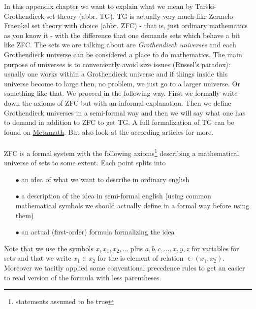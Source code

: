 In this appendix chapter we want to explain what we mean by Tarski-Grothendieck set theory (abbr. TG). TG is actually very much like Zermelo-Fraenkel set theory with choice (abbr. ZFC) - that is, just ordinary mathematics as you know it - with the difference that one demands sets which behave a bit like ZFC. The sets we are talking about are \textit{Grothendieck universes} and each Grothendieck universe can be considered a place to do mathematics. The main purpose of universes is to conveniently avoid size issues (Russel's paradox): usually one works within a Grothendieck universe and if things inside this universe become to large then, no problem, we just go to a larger universe. Or something like that. We proceed in the following way. First we formally write down the axioms of ZFC but with an informal explanation. Then we define Grothendieck universes in a semi-formal way and then we will say what one has to demand in addition to ZFC to get TG. A full formalization of TG can be found on \href{http://us.metamath.org/mpeuni/mmset.html}{Metamath}. But also look at the according \cite{wiki-pedia0en} articles for more.
\\\\
ZFC is a formal system with the following axioms\footnote{statements assumed to be true} describing a mathematical universe of sets to some extent. Each point splits into
\begin{enumerate}
\item[$\bullet$]
an idea of what we want to describe in ordinary english
\item[$\bullet$]
a description of the idea in semi-formal english (using common mathematical symbols we should actually define in a formal way before using them)
\item[$\bullet$]
an actual (first-order) formula formalizing the idea
\end{enumerate}
Note that we use the symbols $x,x_{1},x_{2},\ldots$ plus $a,b,c,\ldots,x,y,z$ for variables for sets and that we write $x_{1} \in x_{2}$ for the {\glqq}is element of{\grqq} relation $\in(x_{1},x_{2})$. Moreover we tacitly applied some conventional precedence rules to get an easier to read version of the formula with less parentheses.
